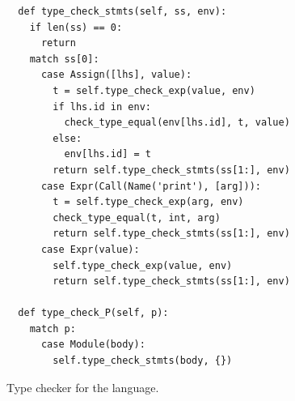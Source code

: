 \documentclass[7x10]{TimesAPriori_MIT}%
\begin{document}
\begin{figure}[tbp]
{\begin{lstlisting}
  def type_check_stmts(self, ss, env):
    if len(ss) == 0:
      return
    match ss[0]:
      case Assign([lhs], value):
        t = self.type_check_exp(value, env)
        if lhs.id in env:
          check_type_equal(env[lhs.id], t, value)
        else:
          env[lhs.id] = t
        return self.type_check_stmts(ss[1:], env)
      case Expr(Call(Name('print'), [arg])):
        t = self.type_check_exp(arg, env)
        check_type_equal(t, int, arg)
        return self.type_check_stmts(ss[1:], env)
      case Expr(value):
        self.type_check_exp(value, env)
        return self.type_check_stmts(ss[1:], env)

  def type_check_P(self, p):
    match p:
      case Module(body):
        self.type_check_stmts(body, {})
\end{lstlisting}
\fi}
\caption{Type checker for the \LangVar{} language.}
\label{fig:type-check-Lvar}
\end{figure}
\end{document}
